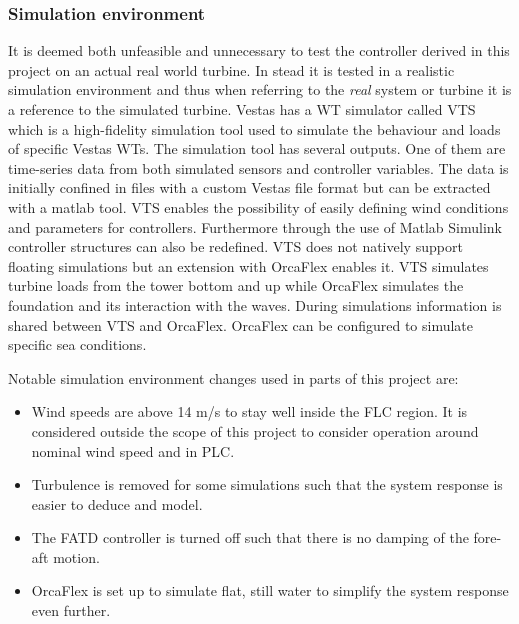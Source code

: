 \subsubsection{Simulation environment}
It is deemed both unfeasible and unnecessary to test the controller derived in this project on an actual real world turbine. In stead it is tested in a realistic simulation environment and thus when referring to the \textit{real} system or turbine it is a reference to the simulated turbine. Vestas has a WT simulator called VTS which is a high-fidelity simulation tool used to simulate the behaviour and loads of specific Vestas WTs. The simulation tool has several outputs. One of them are time-series data from both simulated sensors and controller variables. The data is initially confined in files with a custom Vestas file format but can be extracted with a matlab tool. VTS enables the possibility of easily defining wind conditions and parameters for controllers. Furthermore through the use of Matlab Simulink controller structures can also be redefined. VTS does not natively support floating simulations but an extension with OrcaFlex enables it. VTS simulates turbine loads from the tower bottom and up while OrcaFlex simulates the foundation and its interaction with the waves. During simulations information is shared between VTS and OrcaFlex. OrcaFlex can be configured to simulate specific sea conditions.

Notable simulation environment changes used in parts of this project are:
\begin{itemize}
	\item Wind speeds are above 14 m/s to stay well inside the FLC region. It is considered outside the scope of this project to consider operation around nominal wind speed and in PLC.
	\item Turbulence is removed for some simulations such that the system response is easier to deduce and model. 
	\item The FATD controller is turned off such that there is no damping of the fore-aft motion.
	\item OrcaFlex is set up to simulate flat, still water to simplify the system response even further. 
\end{itemize}

